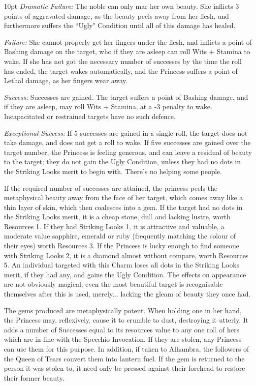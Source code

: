 \begin{myindentpar}{10pt}    \emph{Dramatic Failure:} The noble can only mar her own beauty. She inflicts 3 points of aggravated damage, as the beauty peels away from her flesh, and furthermore suffers the \textquotedblleft Ugly" Condition until all of this damage has healed.

    \emph{Failure:} She cannot properly get her fingers under the flesh, and inflicts a point of Bashing damage on the target, who if they are asleep can roll Wits + Stamina to wake. If she has not got the necessary number of successes by the time the roll has ended, the target wakes automatically, and the Princess suffers a point of Lethal damage, as her fingers wear away.

    \emph{Success:} Successes are gained. The target suffers a point of Bashing damage, and if they are asleep, may roll Wits + Stamina, at a -3 penalty to wake. Incapacitated or restrained targets have no such defence.

    \emph{Exceptional Success:} If 5 successes are gained in a single roll, the target does not take damage, and does not get a roll to wake. If five successes are gained over the target number, the Princess is feeling generous, and can leave a residual of beauty to the target; they do not gain the Ugly Condition, unless they had no dots in the Striking Looks merit to begin with. There's no helping some people.\end{myindentpar}

If the required number of successes are attained, the princess peels the metaphysical beauty away from the face of her target, which comes away like a thin layer of skin, which then coalesces into a gem. If the target had no dots in the Striking Looks merit, it is a cheap stone, dull and lacking lustre, worth Resources 1. If they had Striking Looks 1, it is attractive and valuable, a moderate value sapphire, emerald or ruby (frequently matching the colour of their eyes) worth Resources 3. If the Princess is lucky enough to find someone with Striking Looks 2, it is a diamond almost without compare, worth Resources 5. An individual targeted with this Charm loses all dots in the Striking Looks merit, if they had any, and gains the Ugly Condition. The effects on appearance are not obviously magical; even the most beautiful target is recognisable themselves after this is used, merely... lacking the gleam of beauty they once had.

The gems produced are metaphysically potent. When holding one in her hand, the Princess may, reflexively, cause it to crumble to dust, destroying it utterly. It adds a number of Successes equal to its resources value to any one roll of hers which are in line with the Specchio Invocation. If they are stolen, any Princess can use them for this purpose. In addition, if taken to Alhambra, the followers of the Queen of Tears convert them into lantern fuel. If the gem is returned to the person it was stolen to, it need only be pressed against their forehead to restore their former beauty.

